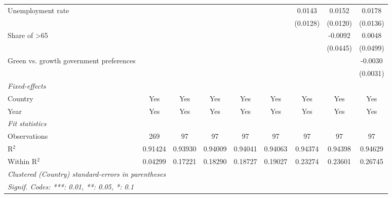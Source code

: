 \begin{table}[htbp]
\begin{tabular}{lcccccccc}
      Unemployment rate                       &               &               &               &              &               & 0.0143        & 0.0152        & 0.0178\\   
                                              &               &               &               &              &               & (0.0128)      & (0.0120)      & (0.0136)\\   
      Share of >65                            &               &               &               &              &               &               & -0.0092       & 0.0048\\   
                                              &               &               &               &              &               &               & (0.0445)      & (0.0499)\\   
      Green vs. growth government preferences &               &               &               &              &               &               &               & -0.0030\\   
                                              &               &               &               &              &               &               &               & (0.0031)\\   
      \midrule
      \emph{Fixed-effects}\\
      Country                                 & Yes           & Yes           & Yes           & Yes          & Yes           & Yes           & Yes           & Yes\\  
      Year                                    & Yes           & Yes           & Yes           & Yes          & Yes           & Yes           & Yes           & Yes\\  
      \midrule
      \emph{Fit statistics}\\
      Observations                            & 269           & 97            & 97            & 97           & 97            & 97            & 97            & 97\\  
      R$^2$                                   & 0.91424       & 0.93930       & 0.94009       & 0.94041      & 0.94063       & 0.94374       & 0.94398       & 0.94629\\  
      Within R$^2$                            & 0.04299       & 0.17221       & 0.18290       & 0.18727      & 0.19027       & 0.23274       & 0.23601       & 0.26745\\  
      \midrule \midrule
      \multicolumn{9}{l}{\emph{Clustered (Country) standard-errors in parentheses}}\\
      \multicolumn{9}{l}{\emph{Signif. Codes: ***: 0.01, **: 0.05, *: 0.1}}\\
   \end{tabular}
\end{table}


